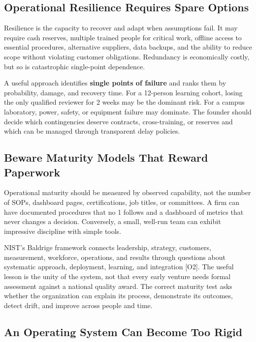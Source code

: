 \subsection{Operational Resilience Requires Spare Options}
\label{sec:operational_resilience}

Resilience is the capacity to recover and adapt when assumptions fail. It may require cash reserves, multiple trained people for critical work, offline access to essential procedures, alternative suppliers, data backups, and the ability to reduce scope without violating customer obligations. Redundancy is economically costly, but so is catastrophic single-point dependence.

A useful approach identifies \textbf{single points of failure} and ranks them by probability, damage, and recovery time. For a 12-person learning cohort, losing the only qualified reviewer for 2 weeks may be the dominant risk. For a campus laboratory, power, safety, or equipment failure may dominate. The founder should decide which contingencies deserve contracts, cross-training, or reserves and which can be managed through transparent delay policies.

\subsection{Beware Maturity Models That Reward Paperwork}
\label{sec:paperwork_vs_capability}

Operational maturity should be measured by observed capability, not the number of SOPs, dashboard pages, certifications, job titles, or committees. A firm can have documented procedures that no 1 follows and a dashboard of metrics that never changes a decision. Conversely, a small, well-run team can exhibit impressive discipline with simple tools.

NIST's Baldrige framework connects leadership, strategy, customers, measurement, workforce, operations, and results through questions about systematic approach, deployment, learning, and integration [O2]. The useful lesson is the unity of the system, not that every early venture needs formal assessment against a national quality award. The correct maturity test asks whether the organization can explain its process, demonstrate its outcomes, detect drift, and improve across people and time.

\subsection{An Operating System Can Become Too Rigid}
\label{sec:avoiding_rigidity}

